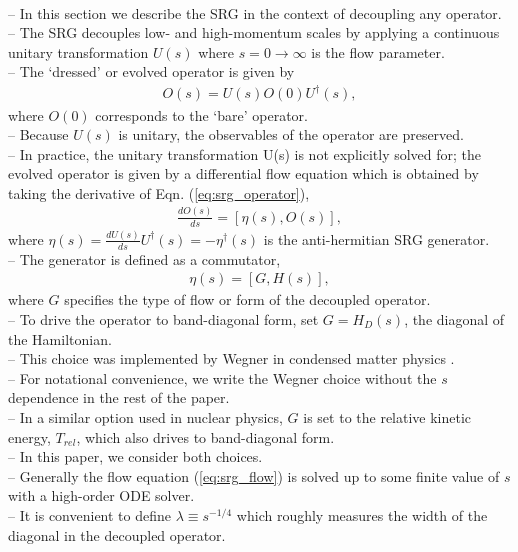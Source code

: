\documentclass[preprintnumbers,floatfix,aps,prc,preprint,nofootinbib]{revtex4-1}
\begin{document}
\\
-- In this section we describe the SRG in the context of decoupling any operator.
\\
-- The SRG decouples low- and high-momentum scales by applying a continuous unitary transformation $U(s)$ where $s=0 \rightarrow \infty$ is the flow parameter.
\\
-- The `dressed' or evolved operator is given by
%
\begin{eqnarray}
	\label{eq:srg_operator}
	O(s) = U(s) O(0) U^{\dagger}(s),
\end{eqnarray}
%
where $O(0)$ corresponds to the `bare' operator.
\\
-- Because $U(s)$ is unitary, the observables of the operator are preserved.
\\
-- In practice, the unitary transformation U(s) is not explicitly solved for; the evolved operator is given by a differential flow equation which is obtained by taking the derivative of Eqn. (\ref{eq:srg_operator}),
%
\begin{eqnarray}
	\label{eq:srg_flow}
	\frac{dO(s)}{ds} = [\eta(s), O(s)],
\end{eqnarray}
%
where $\eta(s)=\frac{dU(s)}{ds} U^{\dagger}(s) = -\eta^{\dagger}(s)$ is the anti-hermitian SRG generator.
\\
-- The generator is defined as a commutator,
%
\begin{eqnarray}
	\label{eq:srg_generator}
	\eta(s) = [G, H(s)],
\end{eqnarray}
%
where $G$ specifies the type of flow or form of the decoupled operator.
\\
-- To drive the operator to band-diagonal form, set $G=H_D(s)$, the diagonal of the Hamiltonian.
\\
-- This choice was implemented by Wegner in condensed matter physics \cite{Wegner:1994ab}.
\\
-- For notational convenience, we write the Wegner choice without the $s$ dependence in the rest of the paper.
\\
-- In a similar option used in nuclear physics, $G$ is set to the relative kinetic energy, $T_{rel}$, which also drives to band-diagonal form.
\\
-- In this paper, we consider both choices.
\\
-- Generally the flow equation (\ref{eq:srg_flow}) is solved up to some finite value of $s$ with a high-order ODE solver.
\\
-- It is convenient to define $\lambda \equiv s^{-1/4}$ which roughly measures the width of the diagonal in the decoupled operator.
\\
\end{document}
